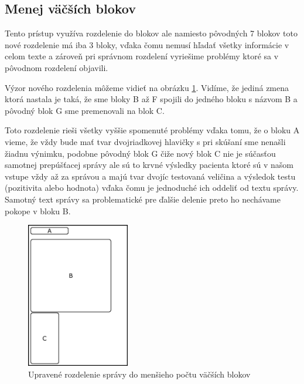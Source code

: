 \subsection{Menej väčších blokov}
\label{spravaLepsie}

Tento prístup využíva rozdelenie do blokov ale namiesto pôvodných 7 blokov toto nové rozdelenie má iba 3 bloky, vďaka čomu nemusí hľadať všetky informácie v celom texte a zároveň pri správnom rozdelení vyriešime problémy ktoré sa v pôvodnom rozdelení objavili. 

Výzor nového rozdelenia môžeme vidieť na obrázku \ref{obr:sprava_uprava}. Vidíme, že jediná zmena ktorá nastala je taká, že sme bloky B až F spojili do jedného bloku s názvom B a pôvodný blok G sme premenovali na blok C. 

Toto rozdelenie rieši všetky vyššie spomenuté problémy vďaka tomu, že o bloku A vieme, že vždy bude mať tvar dvojriadkovej hlavičky s pri skúšaní sme nenašli žiadnu výnimku, podobne pôvodný blok G čiže nový blok C nie je súčasťou samotnej prepúšťacej správy ale sú to krvné výsledky pacienta ktoré sú v našom vstupe vždy až za správou a majú tvar dvojíc testovaná veličina a výsledok testu (pozitivita alebo hodnota) vďaka čomu je jednoduché ich oddeliť od textu správy. Samotný text správy sa problematické pre ďalšie delenie preto ho nechávame pokope v bloku B.

\begin{figure}
	\centerline{\includegraphics[width=0.4\textwidth]{images/vyzor_spravy_vylepsena}}
	\caption[Upravené rozloženie správy]{Upravené rozdelenie správy do menšieho počtu väčších blokov}
	\label{obr:sprava_uprava}
\end{figure}
   
